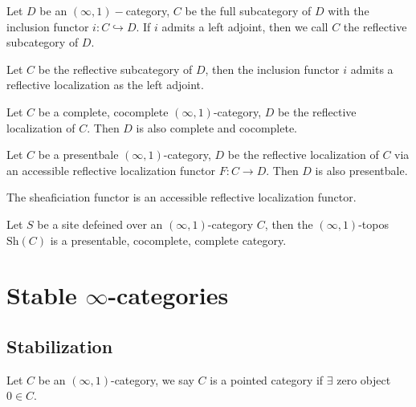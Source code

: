 \begin{definition}
    Let $D$ be an $(\infty,1)-$category, $C$ be the full subcategory of $D$ with the inclusion functor $i:C\hookrightarrow D$. If $i$ admits a left adjoint, then we call $C$ the reflective subcategory of $D$.
\end{definition}

\begin{proposition}
    Let $C$ be the reflective subcategory of $D$, then the inclusion functor $i$ admits a reflective localization as the left adjoint.
\end{proposition}

\begin{proposition}
  Let $C$ be a complete, cocomplete $(\infty,1)$-category, $D$ be the reflective localization of $C$. Then $D$ is also complete and cocomplete.
\end{proposition}

\begin{proposition}
    Let $C$ be a presentbale $(\infty,1)$-category, $D$ be the reflective localization of $C$ via an accessible reflective localization functor $F:C\to D$. Then $D$ is also presentbale.
\end{proposition}


\begin{lemma}
    The sheaficiation functor is an accessible reflective localization functor.
\end{lemma}

\begin{example}
    Let $S$ be a site defeined over an $(\infty,1)$-category $C$, then the $(\infty,1)$-topos $\text{Sh}(C)$ is a presentable, cocomplete, complete category. 
\end{example}






\section{Stable $\infty$-categories}\label{stable}
 
\subsection{Stabilization}


\begin{definition}
    Let $C$ be an $(\infty,1)$-category, we say $C$ is a pointed category if $\exists $ zero object $0\in C$.
\end{definition}

